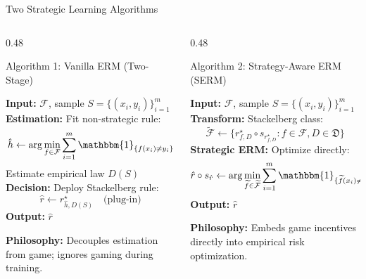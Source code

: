 \documentclass[aspectratio=169, 11pt, t, xcolor=table]{beamer}
\newcommand{\cg}[1]{\mathcal{#1}}
\newcommand{\fk}[1]{\mathfrak{#1}}
\newcommand{\rs}{r^{\star}}
\begin{document}
\begin{frame}{Two Strategic Learning Algorithms}
\small
\begin{columns}[T,onlytextwidth]
\begin{column}{0.48\textwidth}
\begin{block}{Algorithm 1: Vanilla ERM (Two-Stage)}
\begin{algorithmic}[1]
\footnotesize
\State \textbf{Input:} $\cg{F}$, sample $S = \{(x_i,y_i)\}_{i=1}^m$
\State \textbf{Estimation:} Fit non-strategic rule:
\[
  \hat{h} \gets \arg\min_{f \in \cg{F}} \sum_{i=1}^m \mathbbm{1}_{\{f(x_i) \neq y_i\}}
\]
\State Estimate empirical law $D(S)$
\State \textbf{Decision:} Deploy Stackelberg rule:
\[
  \hat{r} \gets \rs_{\hat{h}, D(S)} \quad \text{(plug-in)}
\]
\State \textbf{Output:} $\hat{r}$
\end{algorithmic}
\end{block}
\par{\footnotesize \textcolor{IITBNavy}{\textbf{Philosophy:}} Decouples estimation from game; ignores gaming during training.}
\end{column}

\begin{column}{0.48\textwidth}
\begin{block}{Algorithm 2: Strategy-Aware ERM (SERM)}
\begin{algorithmic}[1]
\footnotesize
\State \textbf{Input:} $\cg{F}$, sample $S = \{(x_i,y_i)\}_{i=1}^m$
\State \textbf{Transform:} Stackelberg class:
\[
  \widetilde{\cg{F}} \gets \{ \rs_{f,D} \circ s_{\rs_{f,D}} : f \in \cg{F}, D \in \fk{D} \}
\]
\State \textbf{Strategic ERM:} Optimize directly:
\[
  \hat{r} \circ s_{\hat{r}} \gets \arg\min_{\widetilde{f} \in \widetilde{\cg{F}}} \sum_{i=1}^m \mathbbm{1}_{\{\widetilde{f}(x_i) \neq y_i\}}
\]
\State \textbf{Output:} $\hat{r}$
\end{algorithmic}
\end{block}
\par{\footnotesize \textcolor{IITBNavy}{\textbf{Philosophy:}} Embeds game incentives directly into empirical risk optimization.}
\end{column}
\end{columns}
\end{frame}
\end{document}
